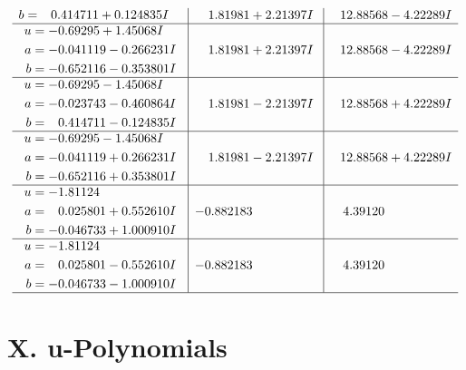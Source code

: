 \documentclass[1p]{elsarticle_modified}
\theoremstyle{definition}
\begin{document}
$$\begin{array}{c|c|c}
\begin{aligned}
b &= \phantom{-}0.414711 + 0.124835 I\end{aligned}
 & \phantom{-}1.81981 + 2.21397 I & \phantom{-}12.88568 - 4.22289 I \\ \hline\begin{aligned}
u &= -0.69295 + 1.45068 I \\
a &= -0.041119 - 0.266231 I \\
b &= -0.652116 - 0.353801 I\end{aligned}
 & \phantom{-}1.81981 + 2.21397 I & \phantom{-}12.88568 - 4.22289 I \\ \hline\begin{aligned}
u &= -0.69295 - 1.45068 I \\
a &= -0.023743 - 0.460864 I \\
b &= \phantom{-}0.414711 - 0.124835 I\end{aligned}
 & \phantom{-}1.81981 - 2.21397 I & \phantom{-}12.88568 + 4.22289 I \\ \hline\begin{aligned}
u &= -0.69295 - 1.45068 I \\
a &= -0.041119 + 0.266231 I \\
b &= -0.652116 + 0.353801 I\end{aligned}
 & \phantom{-}1.81981 - 2.21397 I & \phantom{-}12.88568 + 4.22289 I \\ \hline\begin{aligned}
u &= -1.81124\phantom{ +0.000000I} \\
a &= \phantom{-}0.025801 + 0.552610 I \\
b &= -0.046733 + 1.000910 I\end{aligned}
 & -0.882183\phantom{ +0.000000I} & \phantom{-}4.39120\phantom{ +0.000000I} \\ \hline\begin{aligned}
u &= -1.81124\phantom{ +0.000000I} \\
a &= \phantom{-}0.025801 - 0.552610 I \\
b &= -0.046733 - 1.000910 I\end{aligned}
 & -0.882183\phantom{ +0.000000I} & \phantom{-}4.39120\phantom{ +0.000000I}\\
 \hline 
 \end{array}$$\newpage
\newpage\renewcommand{\arraystretch}{1}
\centering \section*{ X. u-Polynomials}
\end{document}
